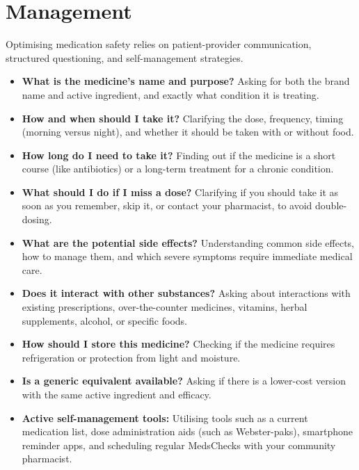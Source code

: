 \section*{Management}
Optimising medication safety relies on patient-provider communication, structured questioning, and self-management strategies.
\begin{itemize}
    \item \textbf{What is the medicine's name and purpose?} Asking for both the brand name and active ingredient, and exactly what condition it is treating.
    \item \textbf{How and when should I take it?} Clarifying the dose, frequency, timing (morning versus night), and whether it should be taken with or without food.
    \item \textbf{How long do I need to take it?} Finding out if the medicine is a short course (like antibiotics) or a long-term treatment for a chronic condition.
    \item \textbf{What should I do if I miss a dose?} Clarifying if you should take it as soon as you remember, skip it, or contact your pharmacist, to avoid double-dosing.
    \item \textbf{What are the potential side effects?} Understanding common side effects, how to manage them, and which severe symptoms require immediate medical care.
    \item \textbf{Does it interact with other substances?} Asking about interactions with existing prescriptions, over-the-counter medicines, vitamins, herbal supplements, alcohol, or specific foods.
    \item \textbf{How should I store this medicine?} Checking if the medicine requires refrigeration or protection from light and moisture.
    \item \textbf{Is a generic equivalent available?} Asking if there is a lower-cost version with the same active ingredient and efficacy.
    \item \textbf{Active self-management tools:} Utilising tools such as a current medication list, dose administration aids (such as Webster-paks), smartphone reminder apps, and scheduling regular MedsChecks with your community pharmacist.
\end{itemize}

